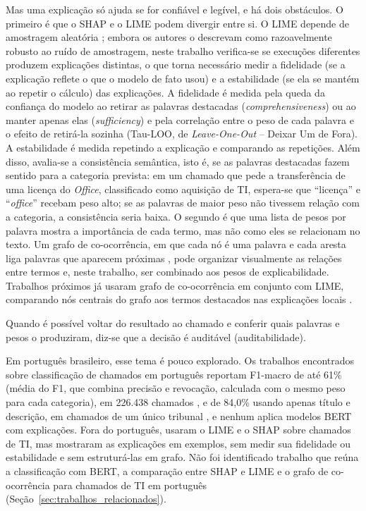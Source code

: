 \documentclass[
    12pt,                %
    openright,           %
    oneside,             %
    a4paper,             %
    english,             %
    brazil               %
]{abntex2}
\begin{document}
Mas uma explicação só ajuda se for confiável e legível, e há dois obstáculos. O primeiro é que o SHAP e o LIME podem divergir entre si. O LIME depende de amostragem aleatória \cite{ribeiro2016}; embora os autores o descrevam como razoavelmente robusto ao ruído de amostragem, neste trabalho verifica-se se execuções diferentes produzem explicações distintas, o que torna necessário medir a fidelidade (se a explicação reflete o que o modelo de fato usou) e a estabilidade (se ela se mantém ao repetir o cálculo) das explicações. A fidelidade é medida pela queda da confiança do modelo ao retirar as palavras destacadas (\textit{comprehensiveness}) ou ao manter apenas elas (\textit{sufficiency}) e pela correlação entre o peso de cada palavra e o efeito de retirá-la sozinha (Tau-LOO, de \textit{Leave-One-Out} -- Deixar Um de Fora). A estabilidade é medida repetindo a explicação e comparando as repetições. Além disso, avalia-se a consistência semântica, isto é, se as palavras destacadas fazem sentido para a categoria prevista: em um chamado que pede a transferência de uma licença do \textit{Office}, classificado como aquisição de TI, espera-se que ``licença'' e ``\textit{office}'' recebam peso alto; se as palavras de maior peso não tivessem relação com a categoria, a consistência seria baixa. O segundo é que uma lista de pesos por palavra mostra a importância de cada termo, mas não como eles se relacionam no texto. Um grafo de co-ocorrência, em que cada nó é uma palavra e cada aresta liga palavras que aparecem próximas \cite{yao2019}, pode organizar visualmente as relações entre termos e, neste trabalho, ser combinado aos pesos de explicabilidade. Trabalhos próximos já usaram grafo de co-ocorrência em conjunto com LIME, comparando nós centrais do grafo aos termos destacados nas explicações locais \cite{talebi2025}.

Quando é possível voltar do resultado ao chamado e conferir quais palavras e pesos o produziram, diz-se que a decisão é auditável (auditabilidade).

Em português brasileiro, esse tema é pouco explorado. Os trabalhos encontrados sobre classificação de chamados em português reportam F1-macro de até 61\% (média do F1, que combina precisão e revocação, calculada com o mesmo peso para cada categoria), em 226.438 chamados \cite{yokota2025}, e de 84,0\% usando apenas título e descrição, em chamados de um único tribunal \cite{carvalho2026}, e nenhum aplica modelos BERT com explicações. Fora do português,  usaram o LIME e o SHAP sobre chamados de TI, mas mostraram as explicações em exemplos, sem medir sua fidelidade ou estabilidade e sem estruturá-las em grafo. Não foi identificado trabalho que reúna a classificação com BERT, a comparação entre SHAP e LIME e o grafo de co-ocorrência para chamados de TI em português (Seção~\ref{sec:trabalhos_relacionados}).
\end{document}
